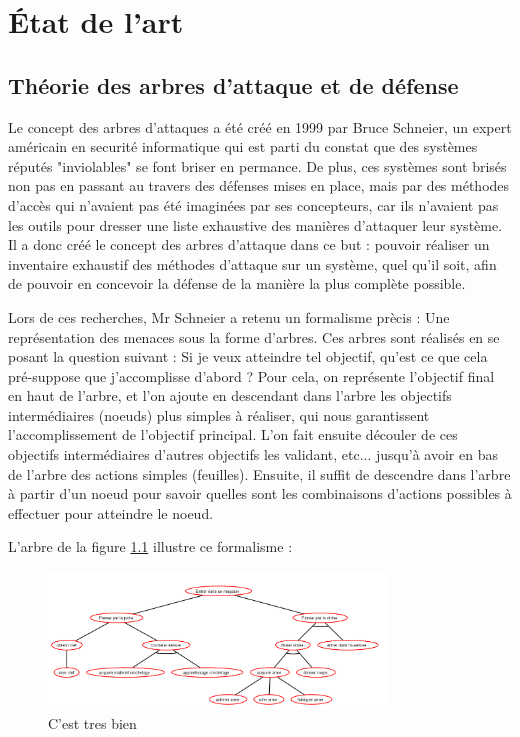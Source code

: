 \chapter{\'Etat de l'art}
	\section{Théorie des arbres d'attaque et de défense}
		Le concept des arbres d'attaques a été créé en 1999 par Bruce Schneier, un expert américain en securité informatique qui est parti du constat que des systèmes réputés "inviolables" se font briser en permance. De plus, ces systèmes sont brisés non pas en passant au travers des défenses mises en place, mais par des méthodes d'accès qui n'avaient pas été imaginées par ses concepteurs, car ils n'avaient pas les outils pour dresser une liste exhaustive des manières d'attaquer leur système. Il a donc créé le concept des arbres d'attaque dans ce but : pouvoir réaliser un inventaire exhaustif des méthodes d'attaque sur un système, quel qu'il soit, afin de pouvoir en concevoir la défense de la manière la plus complète possible.

		Lors de ces recherches, Mr Schneier a retenu un formalisme prècis : Une représentation des menaces sous la forme d'arbres. Ces arbres sont réalisés en se posant la question suivant : Si je veux atteindre tel objectif, qu'est ce que cela pré-suppose que j'accomplisse d'abord ? Pour cela, on représente l'objectif final en haut de l'arbre, et l'on ajoute en descendant dans l'arbre les objectifs intermédiaires (noeuds) plus simples à réaliser, qui nous garantissent l'accomplissement de l'objectif principal. L'on fait ensuite découler de ces objectifs intermédiaires d'autres objectifs les validant, etc... jusqu'à avoir en bas de l'arbre des actions simples (feuilles). Ensuite, il suffit de descendre dans l'arbre à partir d'un noeud pour savoir quelles sont les combinaisons d'actions possibles à effectuer pour atteindre le noeud. 

		L'arbre de la figure \ref{fig:arbre_exemple_1} illustre ce formalisme : 

		\begin{figure}
			\begin{center}
				\includegraphics[width=0.8\textwidth]{figure/Entrer_dans_un_magasin.png}
			\end{center}
			\caption{C'est tres bien}
			\label{fig:arbre_exemple_1}
		\end{figure}

